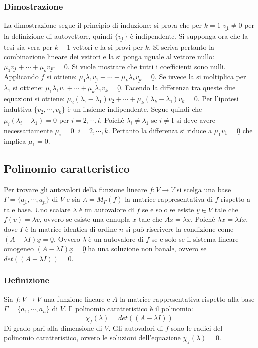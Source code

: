 \subsubsection{Dimostrazione}
La dimostrazione segue il principio di induzione: si prova che per $k=1$ $\underline{v_1}\neq \underline{0}$ per la definizione di autovettore, quindi $\{\underline{v_1}\}$ \`e 
indipendente. Si supponga ora che la tesi sia vera per $k-1$ vettori e la si provi per $k$. Si scriva pertanto la combinazione lineare dei vettori e la si ponga uguale al vettore 
nullo: $\mu_1\underline{v_1}+\cdots+\mu_k\underline{v_K}=\underline{0}$. Si vuole mostrare che tutti i coefficienti sono nulli. Applicando $f$ si ottiene: $\mu_1\lambda_1 
\underline{v_1}+\cdots+\mu_k\lambda_k\underline{v_k}=\underline{0}$. Se invece la si moltiplica per $\lambda_1$ si ottiene: $\mu_1\lambda_1 \underline{v_1}+\cdots+\mu_k\lambda_1
\underline{v_k}=\underline{0}$. Facendo la differenza tra queste due equazioni si ottiene: $\mu_2(\lambda_2-\lambda_1)\underline{v_2}+\cdots+\mu_k(\lambda_k-\lambda_1)
\underline{v_k}=\underline{0}$. Per l'ipotesi induttiva $\{\underline{v_2},\cdots,\underline{v_k}\}$ \`e un insieme indipendente. Segue quindi che $\mu_i(\lambda_i-\lambda_1)=0$ 
per $i=2,\cdots,l$. Poich\`e $\lambda_i\neq \lambda_1$ se $i\neq 1$ si deve avere necessariamente $\mu_i=0\;\;i=2,\cdots,k$. Pertanto la differenza si riduce a $\mu_1
\underline{v_1}=\underline{0}$ che implica $\mu_1=0$.
\subsection{Polinomio caratteristico}
Per trovare gli autovalori della funzione lineare $f:V\rightarrow V$ si scelga una base $\Gamma=\{\underline{a_1},\cdots,\underline{a_n}\}$ di $V$ e sia $A=M_\Gamma(f)$ la 
matrice rappresentativa di $f$ rispetto a tale base. Uno scalare $\lambda$ \`e un autovalore di $f$ se e solo se esiste $\underline{v}\in V$ tale che $f(\underline{v})=\lambda
\underline{v}$, ovvero se esiste una ennupla $\underline{x}$ tale che $A\underline{x}=\lambda\underline{x}$. Poich\`e $\lambda\underline{x}=
\lambda I\underline{x}$, dove $I$ \`e la matrice identica di ordine $n$ si pu\`o riscrivere la condizione come $(A-\lambda I)\underline{x}=\underline{0}$. Ovvero $\lambda$ \`e un
autovalore di $f$ se e solo se il sistema lineare omogeneo $(A-\lambda I)\underline{x}=\underline{0}$ ha una soluzione non banale, ovvero se $det((A-\lambda I))=0$.
\subsubsection{Definizione}
Sia $f:V\rightarrow V$ una funzione lineare e $A$ la matrice rappresentativa rispetto alla base $\Gamma=\{\underline{a_1},\cdots,\underline{a_n}\}$ di $V$. Il polinomio 
caratteristico \`e il polinomio:
\begin{equation}
\chi_f(\lambda)=det((A-\lambda I))
\end{equation}
Di grado pari alla dimensione di $V$. Gli autovalori di $f$ sono le radici del polinomio caratteristico, ovvero le soluzioni dell'equazione $\chi_f(\lambda)=0$. 
